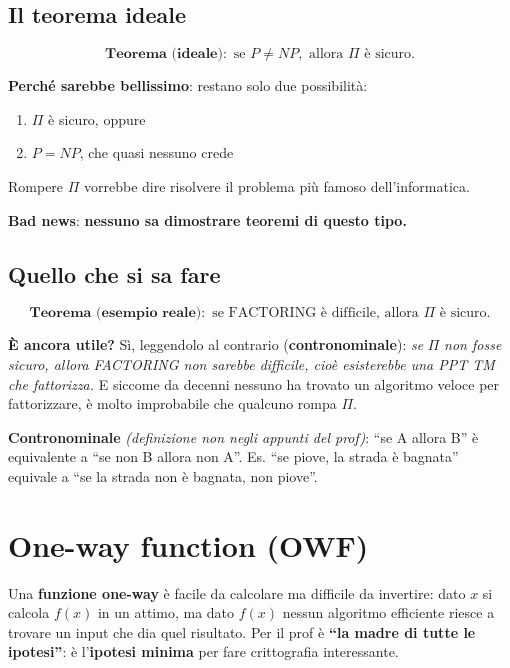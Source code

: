 \subsection{Il teorema ideale}

\[
\textbf{Teorema (ideale)}: \text{ se } P \neq NP, \text{ allora } \Pi \text{ è sicuro.}
\]

\textbf{Perché sarebbe bellissimo}: restano solo due possibilità:

\begin{enumerate}
\def\labelenumi{\arabic{enumi}.}
\tightlist
\item
  \(\Pi\) è sicuro, oppure
\item
  \(P = NP\), che quasi nessuno crede
\end{enumerate}

Rompere \(\Pi\) vorrebbe dire risolvere il problema più famoso dell'informatica.

\textbf{Bad news}: \textbf{nessuno sa dimostrare teoremi di questo tipo.}

\subsection{Quello che si sa fare}

\[
\textbf{Teorema (esempio reale)}: \text{ se FACTORING è difficile, allora } \Pi \text{ è sicuro.}
\]

\textbf{È ancora utile?} Sì, leggendolo al contrario (\textbf{contronominale}): \emph{se} \(\Pi\) \emph{non fosse sicuro, allora FACTORING non sarebbe difficile, cioè esisterebbe una PPT TM che fattorizza.} E siccome da decenni nessuno ha trovato un algoritmo veloce per fattorizzare, è molto improbabile che qualcuno rompa \(\Pi\).

\begin{nota}

\textbf{Contronominale} \emph{(definizione non negli appunti del prof)}: ``se A allora B'' è equivalente a ``se non B allora non A''. Es. ``se piove, la strada è bagnata'' equivale a ``se la strada non è bagnata, non piove''.

\end{nota}

\section{One-way function (OWF)}

\begin{inbreve}

Una \textbf{funzione one-way} è facile da calcolare ma difficile da invertire: dato \(x\) si calcola \(f(x)\) in un attimo, ma dato \(f(x)\) nessun algoritmo efficiente riesce a trovare un input che dia quel risultato. Per il prof è \textbf{``la madre di tutte le ipotesi''}: è l'\textbf{ipotesi minima} per fare crittografia interessante.

\end{inbreve}

